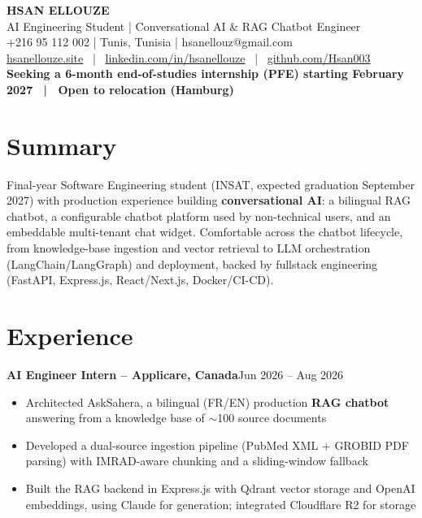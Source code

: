 \documentclass[10pt,a4paper]{article}
\newcommand{\entry}[2]{\vspace{1pt}\noindent\textbf{#1}\hfill{\color{muted}#2}\par}
\begin{document}
\begin{center}
  {\LARGE\bfseries HSAN ELLOUZE}\\[2pt]
  {\color{muted} AI Engineering Student | Conversational AI \& RAG Chatbot Engineer}\\[2pt]
  {\footnotesize +216 95 112 002 | Tunis, Tunisia | hsanellouz@gmail.com}\\[1pt]
  {\footnotesize \href{https://hsanellouze.site}{hsanellouze.site} \ | \ \href{https://linkedin.com/in/hsanellouze}{linkedin.com/in/hsanellouze} \ | \ \href{https://github.com/Hsan003}{github.com/Hsan003}}\\[3pt]
  {\footnotesize\bfseries Seeking a 6-month end-of-studies internship (PFE) starting February 2027 \ | \ Open to relocation (Hamburg)}
\end{center}

\section{Summary}
Final-year Software Engineering student (INSAT, expected graduation September 2027) with production experience building \textbf{conversational AI}: a bilingual RAG chatbot, a configurable chatbot platform used by non-technical users, and an embeddable multi-tenant chat widget. Comfortable across the chatbot lifecycle, from knowledge-base ingestion and vector retrieval to LLM orchestration (LangChain/LangGraph) and deployment, backed by fullstack engineering (FastAPI, Express.js, React/Next.js, Docker/CI-CD).

\section{Experience}
\entry{AI Engineer Intern -- Applicare, Canada}{Jun 2026 -- Aug 2026}
\begin{itemize}
  \item Architected AskSahera, a bilingual (FR/EN) production \textbf{RAG chatbot} answering from a knowledge base of $\sim$100 source documents
  \item Developed a dual-source ingestion pipeline (PubMed XML + GROBID PDF parsing) with IMRAD-aware chunking and a sliding-window fallback
  \item Built the RAG backend in Express.js with Qdrant vector storage and OpenAI embeddings, using Claude for generation; integrated Cloudflare R2 for storage
\end{itemize}
\end{document}
